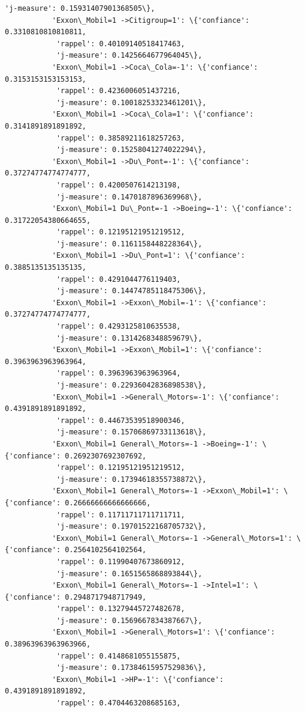 \documentclass[11pt]{article}
\begin{document}
\begin{Verbatim}[commandchars=\\\{\}]
            'j-measure': 0.15931407901368505\},
           'Exxon\_Mobil=1 ->Citigroup=1': \{'confiance': 0.3310810810810811,
            'rappel': 0.40109140518417463,
            'j-measure': 0.1425664677964045\},
           'Exxon\_Mobil=1 ->Coca\_Cola=-1': \{'confiance': 0.3153153153153153,
            'rappel': 0.4236006051437216,
            'j-measure': 0.10018253323461201\},
           'Exxon\_Mobil=1 ->Coca\_Cola=1': \{'confiance': 0.3141891891891892,
            'rappel': 0.38589211618257263,
            'j-measure': 0.15258041274022294\},
           'Exxon\_Mobil=1 ->Du\_Pont=-1': \{'confiance': 0.37274774774774777,
            'rappel': 0.4200507614213198,
            'j-measure': 0.1470187896369968\},
           'Exxon\_Mobil=1 Du\_Pont=-1 ->Boeing=-1': \{'confiance': 0.31722054380664655,
            'rappel': 0.12195121951219512,
            'j-measure': 0.1161158448228364\},
           'Exxon\_Mobil=1 ->Du\_Pont=1': \{'confiance': 0.3885135135135135,
            'rappel': 0.4291044776119403,
            'j-measure': 0.14474785118475306\},
           'Exxon\_Mobil=1 ->Exxon\_Mobil=-1': \{'confiance': 0.37274774774774777,
            'rappel': 0.4293125810635538,
            'j-measure': 0.1314268348859679\},
           'Exxon\_Mobil=1 ->Exxon\_Mobil=1': \{'confiance': 0.3963963963963964,
            'rappel': 0.3963963963963964,
            'j-measure': 0.22936042836898538\},
           'Exxon\_Mobil=1 ->General\_Motors=-1': \{'confiance': 0.4391891891891892,
            'rappel': 0.44673539518900346,
            'j-measure': 0.15706869733113618\},
           'Exxon\_Mobil=1 General\_Motors=-1 ->Boeing=-1': \{'confiance': 0.2692307692307692,
            'rappel': 0.12195121951219512,
            'j-measure': 0.17394618355738872\},
           'Exxon\_Mobil=1 General\_Motors=-1 ->Exxon\_Mobil=1': \{'confiance': 0.26666666666666666,
            'rappel': 0.11711711711711711,
            'j-measure': 0.19701522168705732\},
           'Exxon\_Mobil=1 General\_Motors=-1 ->General\_Motors=1': \{'confiance': 0.2564102564102564,
            'rappel': 0.11990407673860912,
            'j-measure': 0.1651565868893844\},
           'Exxon\_Mobil=1 General\_Motors=-1 ->Intel=1': \{'confiance': 0.2948717948717949,
            'rappel': 0.13279445727482678,
            'j-measure': 0.1569667834387667\},
           'Exxon\_Mobil=1 ->General\_Motors=1': \{'confiance': 0.38963963963963966,
            'rappel': 0.4148681055155875,
            'j-measure': 0.17384615957529836\},
           'Exxon\_Mobil=1 ->HP=-1': \{'confiance': 0.4391891891891892,
            'rappel': 0.4704463208685163,

\end{Verbatim}
\end{document}
